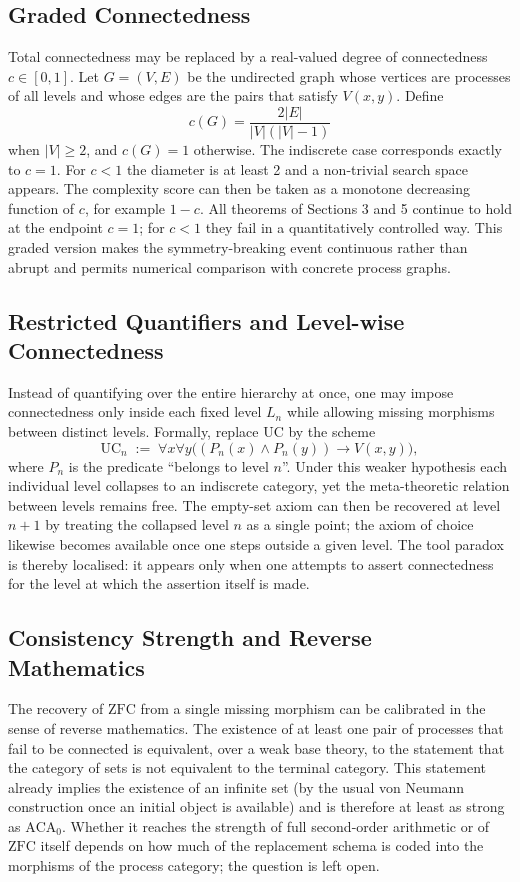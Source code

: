 \documentclass[11pt,a4paper]{article}
\theoremstyle{definition}
\begin{document}
\subsection{Graded Connectedness}

Total connectedness may be replaced by a real-valued degree of connectedness \(c\in[0,1]\). Let \(G=(V,E)\) be the undirected graph whose vertices are processes of all levels and whose edges are the pairs that satisfy \(V(x,y)\). Define
\[
c(G)=\frac{2|E|}{|V|(|V|-1)}
\]
when \(|V|\ge 2\), and \(c(G)=1\) otherwise. The indiscrete case corresponds exactly to \(c=1\). For \(c<1\) the diameter is at least 2 and a non-trivial search space appears. The complexity score can then be taken as a monotone decreasing function of \(c\), for example \(1-c\). All theorems of Sections 3 and 5 continue to hold at the endpoint \(c=1\); for \(c<1\) they fail in a quantitatively controlled way. This graded version makes the symmetry-breaking event continuous rather than abrupt and permits numerical comparison with concrete process graphs.

\subsection{Restricted Quantifiers and Level-wise Connectedness}

Instead of quantifying over the entire hierarchy at once, one may impose connectedness only inside each fixed level \(L_n\) while allowing missing morphisms between distinct levels. Formally, replace \(\mathrm{UC}\) by the scheme
\[
\mathrm{UC}_n\;:=\;\forall x\forall y\bigl((P_n(x)\land P_n(y))\to V(x,y)\bigr),
\]
where \(P_n\) is the predicate ``belongs to level \(n\)''. Under this weaker hypothesis each individual level collapses to an indiscrete category, yet the meta-theoretic relation between levels remains free. The empty-set axiom can then be recovered at level \(n+1\) by treating the collapsed level \(n\) as a single point; the axiom of choice likewise becomes available once one steps outside a given level. The tool paradox is thereby localised: it appears only when one attempts to assert connectedness for the level at which the assertion itself is made.

\subsection{Consistency Strength and Reverse Mathematics}

The recovery of \(\mathrm{ZFC}\) from a single missing morphism can be calibrated in the sense of reverse mathematics. The existence of at least one pair of processes that fail to be connected is equivalent, over a weak base theory, to the statement that the category of sets is not equivalent to the terminal category. This statement already implies the existence of an infinite set (by the usual von Neumann construction once an initial object is available) and is therefore at least as strong as \(\mathrm{ACA}_0\). Whether it reaches the strength of full second-order arithmetic or of \(\mathrm{ZFC}\) itself depends on how much of the replacement schema is coded into the morphisms of the process category; the question is left open.
\end{document}
